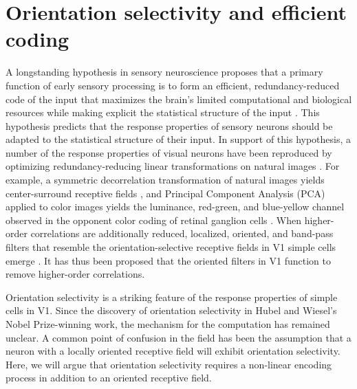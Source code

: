 \section{Orientation selectivity and efficient coding}\label{sec:ch4_selectivity_efficiency}
A longstanding hypothesis in sensory neuroscience proposes that a primary function of early sensory processing is to form an efficient, redundancy-reduced code of the input that maximizes the brain's limited computational and biological resources while making explicit the statistical structure of the input \parencite{barlow2001redundancy}. This hypothesis predicts that the response properties of sensory neurons should be adapted to the statistical structure of their input. In support of this hypothesis, a number of the response properties of visual neurons have been reproduced by optimizing redundancy-reducing linear transformations on natural images \parencite{atick1990towards}. For example, a symmetric decorrelation transformation of natural images yields center-surround receptive fields \parencite{atick1990towards}, and Principal Component Analysis (PCA) applied to color images yields the luminance, red-green, and blue-yellow channel observed in the opponent color coding of retinal ganglion cells \parencite{ruderman1998statistics, buchsbaum1983trichromacy}. When higher-order correlations are additionally reduced, localized, oriented, and band-pass filters that resemble the orientation-selective receptive fields in V1 simple cells emerge \parencite{bell1997independent, olshausen1999probabilistic}. It has thus been proposed that the oriented filters in V1 function to remove higher-order correlations.

Orientation selectivity is a striking feature of the response properties of simple cells in V1. Since the discovery of orientation selectivity in Hubel and Wiesel's Nobel Prize-winning work, the mechanism for the computation has remained unclear. A common point of confusion in the field has been the assumption that a neuron with a locally oriented receptive field will exhibit orientation selectivity. Here, we will argue that orientation selectivity requires a non-linear encoding process in addition to an oriented receptive field.

